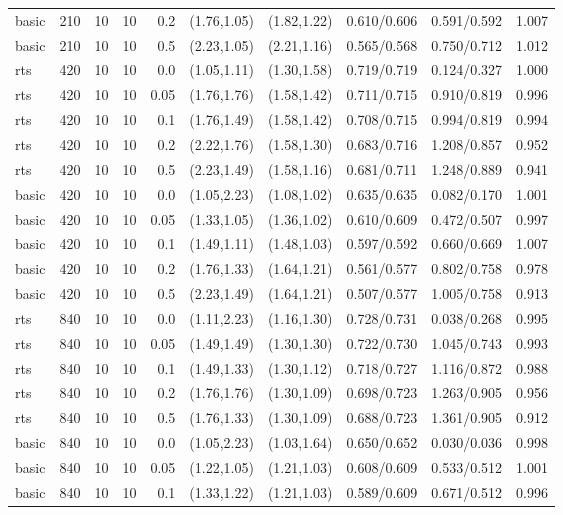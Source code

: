 \begin{tabular}{llrrrccccc}
basic & 210 & 10 & 10 & 0.2 & (1.76,1.05) & (1.82,1.22) & 0.610/0.606 & 0.591/0.592 & 1.007 \\
basic & 210 & 10 & 10 & 0.5 & (2.23,1.05) & (2.21,1.16) & 0.565/0.568 & 0.750/0.712 & 1.012 \\
rts & 420 & 10 & 10 & 0.0 & (1.05,1.11) & (1.30,1.58) & 0.719/0.719 & 0.124/0.327 & 1.000 \\
rts & 420 & 10 & 10 & 0.05 & (1.76,1.76) & (1.58,1.42) & 0.711/0.715 & 0.910/0.819 & 0.996 \\
rts & 420 & 10 & 10 & 0.1 & (1.76,1.49) & (1.58,1.42) & 0.708/0.715 & 0.994/0.819 & 0.994 \\
rts & 420 & 10 & 10 & 0.2 & (2.22,1.76) & (1.58,1.30) & 0.683/0.716 & 1.208/0.857 & 0.952 \\
rts & 420 & 10 & 10 & 0.5 & (2.23,1.49) & (1.58,1.16) & 0.681/0.711 & 1.248/0.889 & 0.941 \\
basic & 420 & 10 & 10 & 0.0 & (1.05,2.23) & (1.08,1.02) & 0.635/0.635 & 0.082/0.170 & 1.001 \\
basic & 420 & 10 & 10 & 0.05 & (1.33,1.05) & (1.36,1.02) & 0.610/0.609 & 0.472/0.507 & 0.997 \\
basic & 420 & 10 & 10 & 0.1 & (1.49,1.11) & (1.48,1.03) & 0.597/0.592 & 0.660/0.669 & 1.007 \\
basic & 420 & 10 & 10 & 0.2 & (1.76,1.33) & (1.64,1.21) & 0.561/0.577 & 0.802/0.758 & 0.978 \\
basic & 420 & 10 & 10 & 0.5 & (2.23,1.49) & (1.64,1.21) & 0.507/0.577 & 1.005/0.758 & 0.913 \\
rts & 840 & 10 & 10 & 0.0 & (1.11,2.23) & (1.16,1.30) & 0.728/0.731 & 0.038/0.268 & 0.995 \\
rts & 840 & 10 & 10 & 0.05 & (1.49,1.49) & (1.30,1.30) & 0.722/0.730 & 1.045/0.743 & 0.993 \\
rts & 840 & 10 & 10 & 0.1 & (1.49,1.33) & (1.30,1.12) & 0.718/0.727 & 1.116/0.872 & 0.988 \\
rts & 840 & 10 & 10 & 0.2 & (1.76,1.76) & (1.30,1.09) & 0.698/0.723 & 1.263/0.905 & 0.956 \\
rts & 840 & 10 & 10 & 0.5 & (1.76,1.33) & (1.30,1.09) & 0.688/0.723 & 1.361/0.905 & 0.912 \\
basic & 840 & 10 & 10 & 0.0 & (1.05,2.23) & (1.03,1.64) & 0.650/0.652 & 0.030/0.036 & 0.998 \\
basic & 840 & 10 & 10 & 0.05 & (1.22,1.05) & (1.21,1.03) & 0.608/0.609 & 0.533/0.512 & 1.001 \\
basic & 840 & 10 & 10 & 0.1 & (1.33,1.22) & (1.21,1.03) & 0.589/0.609 & 0.671/0.512 & 0.996 \\

\end{tabular}
